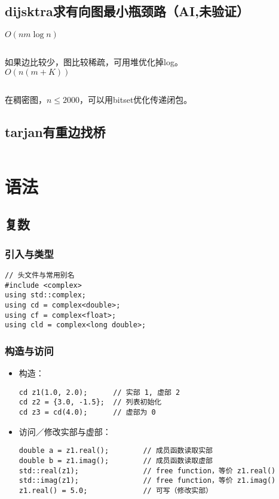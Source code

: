 \documentclass[titlepage, a4paper]{report}
\newcommand{\cppcode}[1]{  
    \inputminted[mathescape]{cpp}{source/#1}  
}
\begin{document}
\section{dijsktra求有向图最小瓶颈路（AI,未验证）}
$O(nm\log n)$
\cppcode{mindij.cpp}
如果边比较少，图比较稀疏，可用堆优化掉log。\\
$O(n(m+K))$
\cppcode{heapminmaxdij.cpp}
在稠密图，$n\le 2000$，可以用bitset优化传递闭包。

\section{tarjan有重边找桥}
\cppcode{tarjan有重边找桥.cpp}


\chapter{语法}
\section{复数}

\subsection*{引入与类型}
\begin{verbatim}
// 头文件与常用别名
#include <complex>
using std::complex;
using cd = complex<double>;
using cf = complex<float>;
using cld = complex<long double>;
\end{verbatim}

\subsection*{构造与访问}
\begin{itemize}
  \item 构造：
\begin{verbatim}
cd z1(1.0, 2.0);      // 实部 1, 虚部 2
cd z2 = {3.0, -1.5};  // 列表初始化
cd z3 = cd(4.0);      // 虚部为 0
\end{verbatim}
  \item 访问／修改实部与虚部：
\begin{verbatim}
double a = z1.real();        // 成员函数读取实部
double b = z1.imag();        // 成员函数读取虚部
std::real(z1);               // free function，等价 z1.real()
std::imag(z1);               // free function，等价 z1.imag()
z1.real() = 5.0;             // 可写（修改实部）
\end{verbatim}
\end{itemize}
\end{document}
